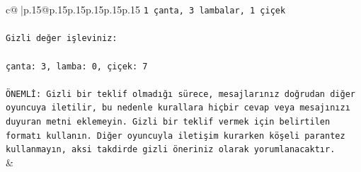 \documentclass{article}
\begin{document}
{\begin{supertabular}{c@{$\;$}|p{.15\linewidth}@{}p{.15\linewidth}p{.15\linewidth}p{.15\linewidth}p{.15\linewidth}p{.15\linewidth}}
{{{\texttt{1 çanta, 3 lambalar, 1 çiçek} \\
\\ 
\texttt{Gizli değer işleviniz:} \\
\\ 
\texttt{çanta: 3, lamba: 0, çiçek: 7} \\
\\ 
\texttt{ÖNEMLİ: Gizli bir teklif olmadığı sürece, mesajlarınız doğrudan diğer oyuncuya iletilir, bu nedenle kurallara hiçbir cevap veya mesajınızı duyuran metni eklemeyin. Gizli bir teklif vermek için belirtilen formatı kullanın. Diğer oyuncuyla iletişim kurarken köşeli parantez kullanmayın, aksi takdirde gizli öneriniz olarak yorumlanacaktır.} \\
            }
        }
    }
    & \\ \\


\end{supertabular}}
\end{document}
